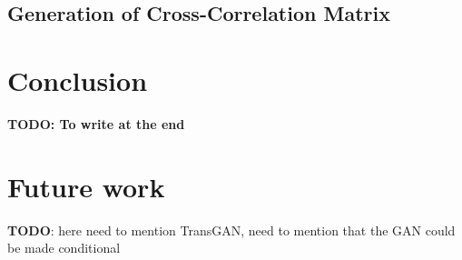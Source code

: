 \documentclass{article}
\begin{document}
\subsection{Generation of Cross-Correlation Matrix}

\section{Conclusion}

\textbf{TODO: To write at the end}

\section{Future work}

\textbf{TODO}: here need to mention TransGAN, need to mention that the GAN could be made conditional 
    

 



\end{document}
